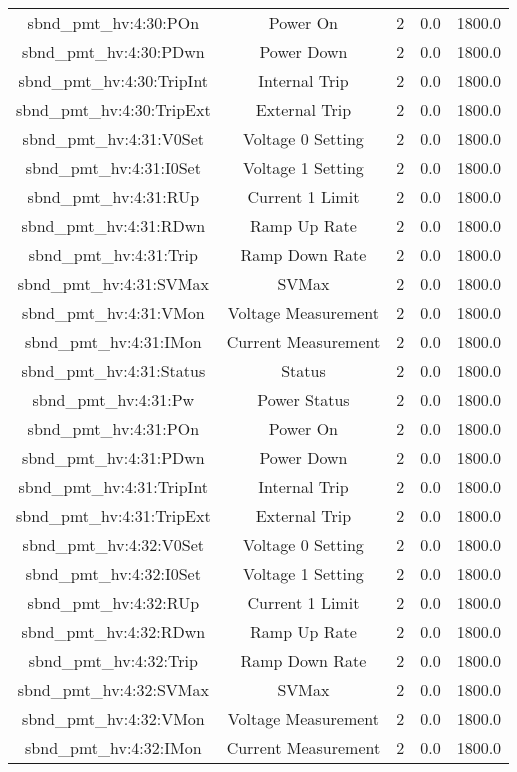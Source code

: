 \begin{center}
\begin{longtable}{c | c c c c }
sbnd\_pmt\_hv:4:30:POn & Power On & 2 & 0.0 & 1800.0\\ 
sbnd\_pmt\_hv:4:30:PDwn & Power Down & 2 & 0.0 & 1800.0\\ 
sbnd\_pmt\_hv:4:30:TripInt & Internal Trip & 2 & 0.0 & 1800.0\\ 
sbnd\_pmt\_hv:4:30:TripExt & External Trip & 2 & 0.0 & 1800.0\\ 
sbnd\_pmt\_hv:4:31:V0Set & Voltage 0 Setting & 2 & 0.0 & 1800.0\\ 
sbnd\_pmt\_hv:4:31:I0Set & Voltage 1 Setting & 2 & 0.0 & 1800.0\\ 
sbnd\_pmt\_hv:4:31:RUp & Current 1 Limit & 2 & 0.0 & 1800.0\\ 
sbnd\_pmt\_hv:4:31:RDwn & Ramp Up Rate & 2 & 0.0 & 1800.0\\ 
sbnd\_pmt\_hv:4:31:Trip & Ramp Down Rate & 2 & 0.0 & 1800.0\\ 
sbnd\_pmt\_hv:4:31:SVMax & SVMax & 2 & 0.0 & 1800.0\\ 
sbnd\_pmt\_hv:4:31:VMon & Voltage Measurement & 2 & 0.0 & 1800.0\\ 
sbnd\_pmt\_hv:4:31:IMon & Current Measurement & 2 & 0.0 & 1800.0\\ 
sbnd\_pmt\_hv:4:31:Status & Status & 2 & 0.0 & 1800.0\\ 
sbnd\_pmt\_hv:4:31:Pw & Power Status & 2 & 0.0 & 1800.0\\ 
sbnd\_pmt\_hv:4:31:POn & Power On & 2 & 0.0 & 1800.0\\ 
sbnd\_pmt\_hv:4:31:PDwn & Power Down & 2 & 0.0 & 1800.0\\ 
sbnd\_pmt\_hv:4:31:TripInt & Internal Trip & 2 & 0.0 & 1800.0\\ 
sbnd\_pmt\_hv:4:31:TripExt & External Trip & 2 & 0.0 & 1800.0\\ 
sbnd\_pmt\_hv:4:32:V0Set & Voltage 0 Setting & 2 & 0.0 & 1800.0\\ 
sbnd\_pmt\_hv:4:32:I0Set & Voltage 1 Setting & 2 & 0.0 & 1800.0\\ 
sbnd\_pmt\_hv:4:32:RUp & Current 1 Limit & 2 & 0.0 & 1800.0\\ 
sbnd\_pmt\_hv:4:32:RDwn & Ramp Up Rate & 2 & 0.0 & 1800.0\\ 
sbnd\_pmt\_hv:4:32:Trip & Ramp Down Rate & 2 & 0.0 & 1800.0\\ 
sbnd\_pmt\_hv:4:32:SVMax & SVMax & 2 & 0.0 & 1800.0\\ 
sbnd\_pmt\_hv:4:32:VMon & Voltage Measurement & 2 & 0.0 & 1800.0\\ 
sbnd\_pmt\_hv:4:32:IMon & Current Measurement & 2 & 0.0 & 1800.0\\ 

\end{longtable}
\end{center}
